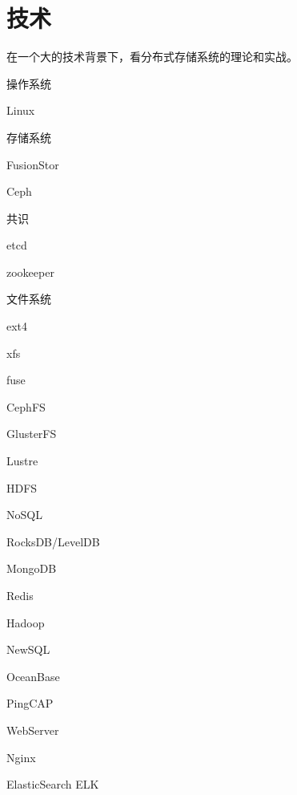 \chapter{技术}

在一个大的技术背景下，看分布式存储系统的理论和实战。

操作系统
\begin{enumbox}
\item Linux
\end{enumbox}

存储系统
\begin{enumbox}
\item FusionStor
\item Ceph
\end{enumbox}

共识
\begin{enumbox}
\item etcd
\item zookeeper
\end{enumbox}

文件系统
\begin{enumbox}
\item ext4 
\item xfs
\item fuse
\item CephFS
\item GlusterFS
\item Lustre
\item HDFS
\end{enumbox}

NoSQL
\begin{enumbox}
\item RocksDB/LevelDB
\item MongoDB
\item Redis
\item Hadoop
\end{enumbox}

NewSQL
\begin{enumbox}
\item OceanBase
\item PingCAP
\end{enumbox}

WebServer
\begin{enumbox}
\item Nginx
\item ElasticSearch ELK
\end{enumbox}
